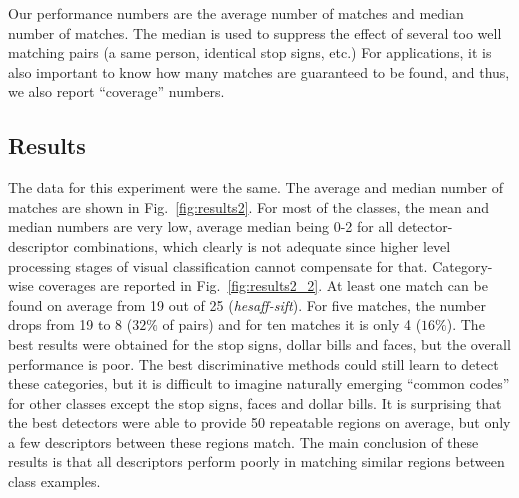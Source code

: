 \documentclass[preprint,authoryear,review]{elsarticle}
\newcommand{\commentNK}[1]{{\bf NK: #1}}
\begin{document}
Our performance numbers are the average number of matches and median
number of matches. The median is used to suppress the effect of
several too well matching pairs (a same person, identical
stop signs, etc.) For applications, it is also important to know how many matches
are guaranteed to be found, and thus,
we also report ``coverage'' numbers.

%
\subsection{Results}
%
The data for this experiment were the same.
The average and median number of matches are shown in
Fig.~\ref{fig:results2}. %
For most of the classes, the mean and median numbers are very low, average median being
0-2 for all detector-descriptor combinations,
which clearly is not adequate since higher level processing stages of
visual classification cannot compensate for that.
Category-wise coverages are reported in Fig.~\ref{fig:results2_2}.
At least one match can be found on average from 19 out of 25
(\textit{hesaff-sift}). For five
matches, the number drops from 19 to 8 ($32\%$ of pairs) and for
ten matches it is only 4 ($16\%$). 
The best results were obtained for the stop signs, dollar bills and
faces, but the overall performance is poor.
The best discriminative methods could still learn to detect these
categories, but it is difficult to imagine naturally emerging
``common codes'' for other classes except the stop signs, faces and
dollar bills.
It is surprising that the best detectors were able to provide
50 repeatable regions on average, but only a few descriptors
between these regions match.
The main conclusion of these results is that all descriptors perform
poorly in matching similar regions between class examples.
\end{document}
